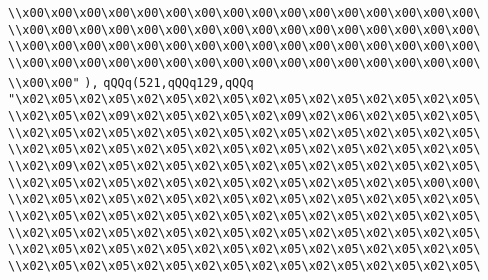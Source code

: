 \verb|\\x00\x00\x00\x00\x00\x00\x00\x00\x00\x00\x00\x00\x00\x00\x00\x00\|\newline
\verb|\\x00\x00\x00\x00\x00\x00\x00\x00\x00\x00\x00\x00\x00\x00\x00\x00\|\newline
\verb|\\x00\x00\x00\x00\x00\x00\x00\x00\x00\x00\x00\x00\x00\x00\x00\x00\|\newline
\verb|\\x00\x00\x00\x00\x00\x00\x00\x00\x00\x00\x00\x00\x00\x00\x00\x00\|\newline
\verb|\\x00\x00"|\newline
\verb|),|\newline
\verb|qQQq(521,qQQq129,qQQq|\newline
\verb|"\x02\x05\x02\x05\x02\x05\x02\x05\x02\x05\x02\x05\x02\x05\x02\x05\|\newline
\verb|\\x02\x05\x02\x09\x02\x05\x02\x05\x02\x09\x02\x06\x02\x05\x02\x05\|\newline
\verb|\\x02\x05\x02\x05\x02\x05\x02\x05\x02\x05\x02\x05\x02\x05\x02\x05\|\newline
\verb|\\x02\x05\x02\x05\x02\x05\x02\x05\x02\x05\x02\x05\x02\x05\x02\x05\|\newline
\verb|\\x02\x09\x02\x05\x02\x05\x02\x05\x02\x05\x02\x05\x02\x05\x02\x05\|\newline
\verb|\\x02\x05\x02\x05\x02\x05\x02\x05\x02\x05\x02\x05\x02\x05\x00\x00\|\newline
\verb|\\x02\x05\x02\x05\x02\x05\x02\x05\x02\x05\x02\x05\x02\x05\x02\x05\|\newline
\verb|\\x02\x05\x02\x05\x02\x05\x02\x05\x02\x05\x02\x05\x02\x05\x02\x05\|\newline
\verb|\\x02\x05\x02\x05\x02\x05\x02\x05\x02\x05\x02\x05\x02\x05\x02\x05\|\newline
\verb|\\x02\x05\x02\x05\x02\x05\x02\x05\x02\x05\x02\x05\x02\x05\x02\x05\|\newline
\verb|\\x02\x05\x02\x05\x02\x05\x02\x05\x02\x05\x02\x05\x02\x05\x02\x05\|\newline

